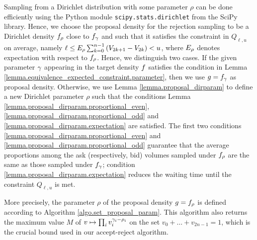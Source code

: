 \documentclass[10pt, article,table]{article}
\begin{document}
Sampling from a Dirichlet distribution with some parameter $\rho$ can be done efficiently using the Python module \texttt{scipy.stats.dirichlet} from the SciPy library. Hence, we choose the proposal density for the rejection sampling to be a Dirichlet density $\dirichletDensity[\rho]$ close to $\dirichletDensity$ and such that it satisfies the constraint in $Q_{\ell,u}$ on average, namely   $\ell \leq \Expectation_{\rho} \sum_{k=0}^{n-1} \left( V_{2k+1} - V_{2k} \right) < u $, where $\Expectation_{\rho}$ denotes expectation with respect to $\dirichletDensity[\rho]$. Hence, we distinguish two cases. If the given parameter $\dirparam$ appearing in the target density $\targetDensity$ satisfies the condition in Lemma \ref{lemma.equivalence_expected_constraint.parameter}, then we use $\proposalDensity = \dirichletDensity$ as proposal density. Otherwise, we use Lemma \ref{lemma.proposal_dirparam} to define a new Dirichlet parameter $\rho$ such that the conditions Lemma \ref{lemma.proposal_dirparam.proportional_even}, \ref{lemma.proposal_dirparam.proportional_odd} and \ref{lemma.proposal_dirparam.expectation} are satisfied. The first two conditions \ref{lemma.proposal_dirparam.proportional_even} and \ref{lemma.proposal_dirparam.proportional_odd} guarantee that the average proportions among the ask (respectively, bid) volumes sampled under $\dirichletDensity[\rho]$ are the same as those sampled under $\dirichletDensity$; condition \ref{lemma.proposal_dirparam.expectation} reduces the waiting time until the constraint $Q_{\ell,u}$ is met. 

More precisely, the parameter $\rho$ of the proposal density $\proposalDensity = \dirichletDensity[\rho]$ is defined according to Algorithm \ref{algo.set_proposal_param}. This algorithm also returns the maximum value $M$ of $v\mapsto \prod_{i} v_{i}^{\dirparam_i - \rho_i}$ on the set $v_0 +\dots +v_{2n-1} = 1$, which is the crucial bound used in our accept-reject algorithm.
\end{document}
